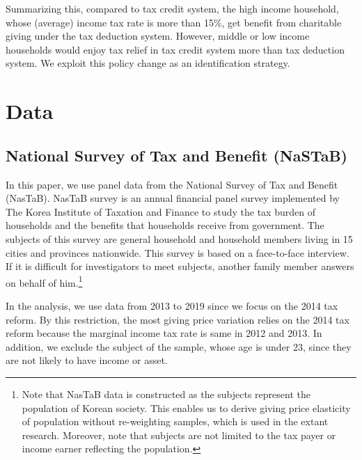 \documentclass[ review  , 3p ]{elsarticle}
\begin{document}
  Summarizing this, compared to tax credit system, the high income household, whose (average) income tax rate is more than 15\%, get benefit from charitable giving under the tax deduction system. However, middle or low income households would enjoy tax relief in tax credit system more than tax deduction system. We exploit this policy change as an identification strategy.

  \hypertarget{data}{%
  \section{Data}\label{data}}

  \hypertarget{national-survey-of-tax-and-benefit-nastab}{%
  \subsection{National Survey of Tax and Benefit (NaSTaB)}\label{national-survey-of-tax-and-benefit-nastab}}

  In this paper, we use panel data from the National Survey of Tax and Benefit (NasTaB).
  NasTaB survey is an annual financial panel survey
  implemented by The Korea Institute of Taxation and Finance
  to study the tax burden of households and the benefits that households receive from government.
  The subjects of this survey are general household and household members living in 15 cities
  and provinces nationwide.
  This survey is based on a face-to-face interview.
  If it is difficult for investigators to meet subjects, another family member answers on behalf of him.\footnote{Note that NasTaB data is constructed as the subjects represent the population of Korean society. This enables us to derive giving price elasticity of population without re-weighting samples, which is used in the extant research. Moreover, note that subjects are not limited to the tax payer or income earner reflecting the population.}

  In the analysis, we use data from 2013 to 2019 since
  we focus on the 2014 tax reform.
  By this restriction, the most giving price variation relies on the 2014 tax reform because
  the marginal income tax rate is same in 2012 and 2013.
  In addition, we exclude the subject of the sample, whose age is under 23, since they are not likely to have income or asset.
\end{document}

